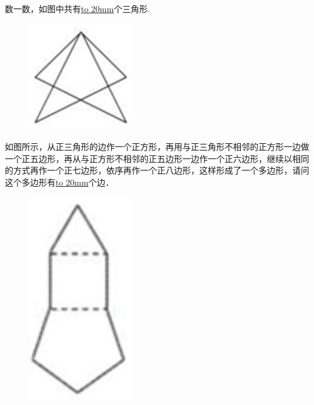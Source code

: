 \item {
    数一数，如图中共有\underline{\hbox to 20mm{}}个三角形.
    \begin{figure}[H] 
        \centering
        \includegraphics[width=0.4\textwidth]{./pics/Chapter_6/2015_2.png}
    \end{figure}
}

\item {
    如图所示，从正三角形的边作一个正方形，再用与正三角形不相邻的正方形一边做一个正五边形，再从与正方形不相邻的正五边形一边作一个正六边形，继续以相同的方式再作一个正七边形，依序再作一个正八边形，这样形成了一个多边形，请问这个多边形有\underline{\hbox to 20mm{}}个边．
    \begin{figure}[H] 
        \centering
        \includegraphics[width=0.4\textwidth]{./pics/Chapter_6/2015_3.png}
    \end{figure}
}


